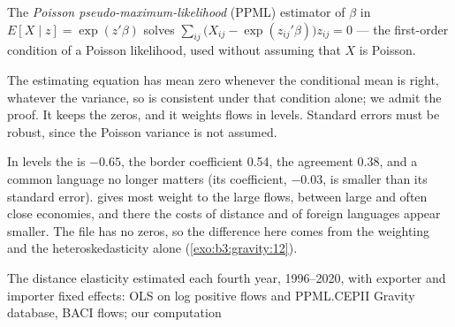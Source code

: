 \begin{definition}\label{def:b3:gravity:ppml}
The \emph{Poisson pseudo-maximum-likelihood} (PPML) estimator of $\beta$ in $E[X \mid z] =
\exp(z'\beta)$ solves $\sum_{ij}\bigl(X_{ij} - \exp(z_{ij}'\beta)\bigr)z_{ij} = 0$ --- the first-order
condition of a Poisson likelihood, used without assuming that $X$ is Poisson.
\end{definition}

The estimating equation has mean zero whenever the conditional mean is right,
whatever the variance, so  is consistent under that condition alone; we
admit the proof. It keeps the zeros, and it weights flows in levels. Standard
errors must be robust, since the Poisson variance is not assumed.

\label{lst:b3:gravity:ppml}

\label{out:b3:gravity:ppml}

In levels the  is $-0.65$, the border coefficient 0.54, the
agreement 0.38, and a common language no longer matters (its coefficient,
$-0.03$, is smaller than its standard error).  gives most weight to the large
flows, between large and often close economies, and there the costs of
distance and of foreign languages appear smaller. The file has no zeros, so
the difference here comes from the weighting and the heteroskedasticity alone
(\cref{exo:b3:gravity:12}).

\begin{omchart}{The distance elasticity estimated each fourth year, 1996--2020,
with exporter and importer fixed effects: OLS on log positive flows and PPML.}{CEPII
Gravity database, BACI flows; our computation}
\end{omchart}

